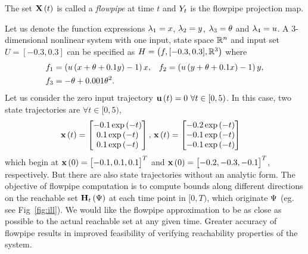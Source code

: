 %
The set $\mathbf{X}\left(t\right)$ is called a 
\emph{flowpipe} at time $t$ and $Y_{t}$ is the flowpipe projection map.
%
\begin{example}\label{eg:ill}
Let us denote the function expressions $\lambda_{1} = x$, $\lambda_{2} = y$,
$\lambda_{3} = \theta$ and $\lambda_{4} = u$.  A $3$-dimensional nonlinear
system with one input, state space $\mathbb{R}^n$ and input set $U =
[-0.3,0.3]$ can be specified as $H = \left(f,[-0.3,0.3],\mathbb{R}^3\right)$ where
%
\begin{align*}
& f_1 = \left( u\left( x + \theta + 0.1y \right) - 1\right)x,
& f_2 = \left( u\left( y + \theta + 0.1x \right) - 1\right)y,\\
& f_3 = -\theta + 0.001\theta^2.
\end{align*}
%
Let us consider the zero input trajectory $\mathbf{u}\left(t\right) = 0~\forall
t\in[0,5)$.  In this case, two state trajectories are $\forall
t\in[0,5)$,
%
\begin{align*}
\mathbf{x}\left(t\right) = \begin{bmatrix} -0.1\exp\left(-t\right)\\ 0.1\exp\left(-t\right)\\ 0.1\exp\left(-t\right) \end{bmatrix},~
& \mathbf{x}\left(t\right) = \begin{bmatrix} -0.2\exp\left(-t\right)\\ -0.1\exp\left(-t\right)\\ -0.1\exp\left(-t\right) \end{bmatrix}
\end{align*}
%
which begin at $\mathbf{x}\left(0\right) = \begin{bmatrix}-0.1,0.1,0.1\end{bmatrix}^T$ and $\mathbf{x}\left(0\right)
= \begin{bmatrix}-0.2,-0.3,-0.1\end{bmatrix}^T$, respectively.
%
But there are also state trajectories without an analytic form.  The
objective of flowpipe computation is to compute bounds along different
directions on the reachable set $\mathbf{H}_{t}\left(\Psi\right)$ at each time
point in $[0,T)$, which originate $\Psi$ (eg. see Fig~\ref{fig:ill}).
%
We would like the flowpipe approximation to be as close as possible to
the actual reachable set at any given time.  Greater accuracy of flowpipe results in
improved feasibility of verifying reachability properties of the
system.
\end{example}
